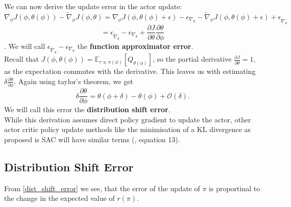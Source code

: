 We can now derive the update error in the actor update:
\begin{equation}
    \nabla_{\phi} J(\phi, \theta(\phi)) - \widetilde{\nabla}_\phi J(\phi, \theta) = \nabla_{\phi} J(\phi, \theta(\phi) + \epsilon) - \epsilon_{\nabla_{\theta}} - \widetilde{\nabla}_\phi J(\phi, \theta(\phi) + \epsilon) + \epsilon_{\widetilde{\nabla}_{\theta}}
\end{equation}
\begin{equation*}
    = \epsilon_{\widetilde{\nabla}_{\theta}} - \epsilon_{\nabla_{\theta}} + \frac{\partial J}{\partial \theta} \frac{\partial \theta}{\partial \phi}
\end{equation*}
. We will call $\epsilon_{\widetilde{\nabla}_{\theta}} - \epsilon_{\nabla_{\theta}}$ the  \textbf{function approximator error}. \\
Recall that $J(\phi, \theta(\phi)) = \mathbb{E}_{\tau \propto \pi(\phi)}\left[Q_{\theta(\phi)}\right]$, so the partial derivative $\frac{\partial J}{\partial \theta} = 1$, 
as the expectation commutes with the derivative. This leaves us with estimating $\delta \frac{\partial \theta}{\partial \phi}$. Again using taylor's theorem, we get 
\begin{equation}
    \label{dist_shift_error}
    \delta \frac{\partial \theta}{\partial \phi} = \theta(\phi + \delta) - \theta(\phi) + \mathcal{O}(\delta).
\end{equation}
We will call this error the \textbf{distribution shift error}.\\
While this derivation assumes direct policy gradient to update the actor, other actor critic policy update methods like the minimisation of a KL divergence as 
proposed is SAC will have similar terms (\cite{SAC}, equation 13).

\subsection{Distribution Shift Error}
From \ref{dist_shift_error} we see, that the error of the update of $\pi$ is proportinal to the change in the 
expected value of $r(\pi)$.\\ 

